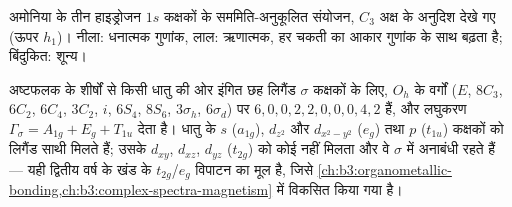 \begin{omfigure}

{\small अमोनिया के तीन हाइड्रोजन $1s$ कक्षकों के सममिति-अनुकूलित संयोजन,
$C_3$ अक्ष के अनुदिश देखे गए (ऊपर $h_1$)। नीला: धनात्मक
गुणांक, लाल: ऋणात्मक, हर चकती का आकार
गुणांक के साथ बढ़ता है; बिंदुकित: शून्य।}
\end{omfigure}

\begin{example}[किसी धातु के चारों ओर छह लिगैंड]\label{ex:b3:group-theory-applied:ml6}
अष्टफलक के शीर्षों से किसी धातु की ओर इंगित छह लिगैंड $\sigma$ कक्षकों के लिए,
$O_h$ के वर्गों ($E$, $8C_3$, $6C_2$, $6C_4$,
$3C_2$, $i$, $6S_4$, $8S_6$, $3\sigma_h$, $6\sigma_d$) पर  $6, 0, 0, 2, 2, 0, 0, 0, 4,
2$ हैं, और लघुकरण $\Gamma_\sigma = A_{1g} + E_g + T_{1u}$ देता है। धातु के $s$
($a_{1g}$), $d_{z^2}$ और $d_{x^2-y^2}$ ($e_g$) तथा $p$ ($t_{1u}$) कक्षकों को लिगैंड
साथी मिलते हैं; उसके $d_{xy}$, $d_{xz}$, $d_{yz}$ ($t_{2g}$) को कोई नहीं मिलता और वे
$\sigma$ में अनाबंधी रहते हैं --- यही द्वितीय वर्ष के खंड के $t_{2g}$/$e_g$ विपाटन का मूल है,
जिसे \cref{ch:b3:organometallic-bonding,ch:b3:complex-spectra-magnetism} में विकसित किया गया है।
\end{example}


